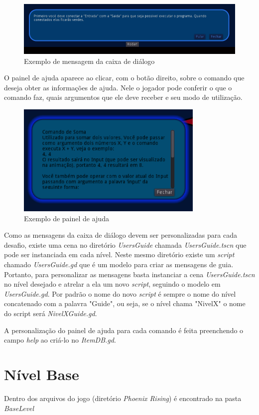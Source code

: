 \begin{figure}[H]
    \includegraphics[width=\textwidth]{../figuras/exemplo_users_guide.png}
    \caption{Exemplo de mensagem da caixa de diálogo}
\end{figure}

O painel de ajuda aparece ao clicar, com o botão direito, sobre o 
comando que deseja obter as informações de ajuda. Nele o jogador pode conferir 
o que o comando faz, quais argumentos que ele deve receber e seu modo de 
utilização.

\begin{figure}[H]
    \includegraphics[width=0.8\textwidth]{../figuras/exemplo_help_panel.png}
    \caption{Exemplo de painel de ajuda}
\end{figure}

Como as mensagens da caixa de diálogo devem ser personalizadas para cada desafio, 
existe uma cena no diretório \textit{UsersGuide} chamada \textit{UsersGuide.tscn}
que pode ser instanciada em cada nível. Neste mesmo diretório existe um 
\textit{script} chamado \textit{UsersGuide.gd} que é um modelo para criar as 
mensagens de guia. Portanto, para personalizar as mensagens basta instanciar a 
cena \textit{UsersGuide.tscn} no nível desejado e atrelar a ela um novo 
\textit{script}, seguindo o modelo em \textit{UsersGuide.gd}. Por padrão o nome 
do novo \textit{script} é sempre o nome do nível concatenado com a palavra 
"Guide", ou seja, se o nível chama "NivelX" o nome do script será 
\textit{NivelXGuide.gd}.

A personalização do painel de ajuda para cada comando é feita preenchendo o 
campo \textit{help} ao criá-lo no \textit{ItemDB.gd}.

\section{Nível Base}

Dentro dos arquivos do jogo (diretório \textit{Phoenix Rising}) é encontrado na
pasta \textit{BaseLevel}



